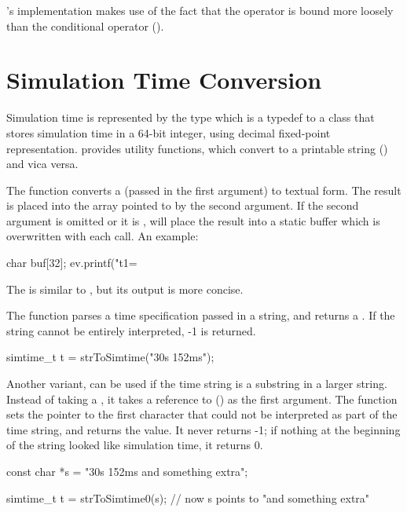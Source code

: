 's implementation makes use of the fact that the \ttt{<<} operator
is bound more loosely than the conditional operator ().



\section{Simulation Time Conversion}

Simulation time is represented by the type 
which is a typedef to a class that stores simulation time in a 64-bit integer, using
decimal ﬁxed-point representation.
{\opp} provides utility functions, which convert 
to a printable string () and vica versa.

The  function converts a 
(passed in the first argument) to textual form. The result is placed into
the  array pointed to by the second argument. If the second argument is omitted
or it is ,  will place the result into a
static buffer which is overwritten with each call. An example:

\begin{cpp}
char buf[32];
ev.printf("t1=%
\end{cpp}

The  is similar to ,
but its output is more concise.

The  function parses a time specification passed
in a string, and returns a . If the string cannot
be entirely interpreted, -1 is returned.

\begin{cpp}
simtime_t t = strToSimtime("30s 152ms");
\end{cpp}

Another variant,  can be used if the time
string is a substring in a larger string. Instead of taking a ,
it takes a reference to  () as the first argument.  The
function sets the pointer to the first character that could not be
interpreted as part of the time string, and returns the value. It
never returns -1; if nothing at the beginning of the string looked
like simulation time, it returns 0.

\begin{cpp}
const char *s = "30s 152ms and something extra";

simtime_t t = strToSimtime0(s); // now s points to "and something extra"
\end{cpp}


